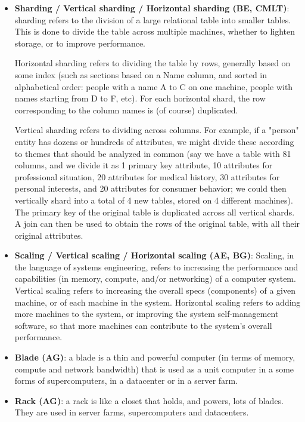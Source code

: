 \documentclass{article}
\begin{document}
\begin{itemize}
	\item \textbf{Sharding / Vertical sharding / Horizontal sharding (BE, CMLT)}: sharding refers to the division of a large relational table into smaller tables. This is done to divide the table across multiple machines, whether to lighten storage, or to improve performance.

	Horizontal sharding refers to dividing the table by rows, generally based on some index (such as sections based on a Name column, and sorted in alphabetical order: people with a name A to C on one machine, people with names starting from D to F, etc). For each horizontal shard, the row corresponding to the column names is (of course) duplicated.

	Vertical sharding refers to dividing across columns. For example, if a "person" entity has dozens or hundreds of attributes, we might divide these according to themes that should be analyzed in common (say we have a table with 81 columns, and we divide it as 1 primary key attribute, 10 attributes for professional situation, 20 attributes for medical history, 30 attributes for personal interests, and 20 attributes for consumer behavior; we could then vertically shard into a total of 4 new tables, stored on 4 different machines). The primary key of the original table is duplicated across all vertical shards. A join can then be used to obtain the rows of the original table, with all their original attributes.

	\item \textbf{Scaling / Vertical scaling / Horizontal scaling (AE, BG)}: Scaling, in the language of systems engineering, refers to increasing the performance and capabilities (in memory, compute, and/or networking) of a computer system. Vertical scaling refers to increasing the overall specs (components) of a given machine, or of each machine in the system. Horizontal scaling refers to adding more machines to the system, or improving the system self-management software, so that more machines can contribute to the system's overall performance. 

	\item \textbf{Blade (AG)}: a blade is a thin and powerful computer (in terms of memory, compute and network bandwidth) that is used as a unit computer in a some forms of supercomputers, in a datacenter or in a server farm.
	
	\item \textbf{Rack (AG)}: a rack is like a closet that holds, and powers, lots of blades. They are used in server farms, supercomputers and datacenters.


\end{itemize}
\end{document}
